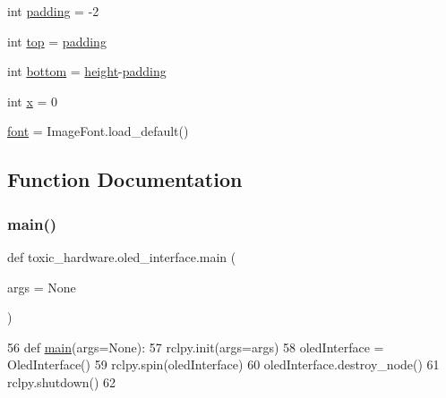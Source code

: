 \begin{DoxyCompactItemize}
int \mbox{\hyperlink{namespacetoxic__hardware_1_1oled__interface_a78dca952886227190969e885fbdd4fb4}{padding}} = -\/2
\item 
int \mbox{\hyperlink{namespacetoxic__hardware_1_1oled__interface_af93f4f37fc2ad9c37af4a715423b110c}{top}} = \mbox{\hyperlink{namespacetoxic__hardware_1_1oled__interface_a78dca952886227190969e885fbdd4fb4}{padding}}
\item 
int \mbox{\hyperlink{namespacetoxic__hardware_1_1oled__interface_a323a7064fba6e15e3e542e34fb19764e}{bottom}} = \mbox{\hyperlink{namespacetoxic__hardware_1_1oled__interface_a509290c21d570ff479c1b9d9b1fe8810}{height}}-\/\mbox{\hyperlink{namespacetoxic__hardware_1_1oled__interface_a78dca952886227190969e885fbdd4fb4}{padding}}
\item 
int \mbox{\hyperlink{namespacetoxic__hardware_1_1oled__interface_a6150e0515f7202e2fb518f7206ed97dc}{x}} = 0
\item 
\mbox{\hyperlink{namespacetoxic__hardware_1_1oled__interface_af18bb9025627467c42857f6b57902a47}{font}} = Image\+Font.\+load\+\_\+default()
\end{DoxyCompactItemize}


\subsection{Function Documentation}
\mbox{\label{namespacetoxic__hardware_1_1oled__interface_accb1149d5c8c645c307fcb16452ac121}} 
\subsubsection{\texorpdfstring{main()}{main()}}
{\footnotesize\ttfamily def toxic\+\_\+hardware.\+oled\+\_\+interface.\+main (\begin{DoxyParamCaption}\item[{}]{args = {\ttfamily None} }\end{DoxyParamCaption})}


\begin{DoxyCode}
56 \textcolor{keyword}{def }\mbox{\hyperlink{namespacetoxic__hardware_1_1oled__interface_accb1149d5c8c645c307fcb16452ac121}{main}}(args=None):
57     rclpy.init(args=args)
58     oledInterface = OledInterface()
59     rclpy.spin(oledInterface)
60     oledInterface.destroy\_node()
61     rclpy.shutdown()
62 
\end{DoxyCode}


